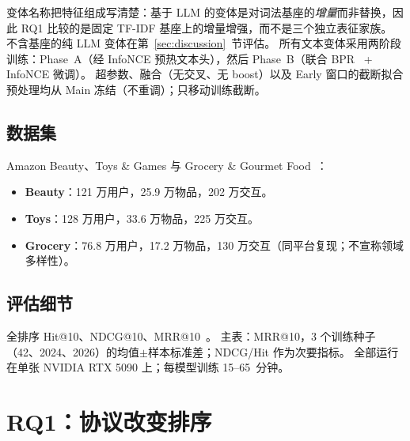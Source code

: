 \documentclass[sigconf,natbib=true,anonymous]{acmart}
\newcommand{\tfidf}{\textsc{TF-IDF}\xspace}
\begin{document}
变体名称把特征组成写清楚：基于 LLM 的变体是对词法基座的\emph{增量}而非替换，因此 RQ1 比较的是固定 \tfidf 基座上的增量增强，而不是三个独立表征家族。
不含基座的纯 LLM 变体在第~\ref{sec:discussion}~节评估。
所有文本变体采用两阶段训练：Phase~A（经 InfoNCE 预热文本头），然后 Phase~B（联合 BPR~\cite{rendle2009bpr} + InfoNCE 微调）。
超参数、融合（无交叉、无 boost）以及 Early 窗口的截断拟合预处理均从 Main 冻结（不重调）；只移动训练截断。

\subsection{数据集}

Amazon Beauty、Toys \& Games 与 Grocery \& Gourmet Food~\cite{mcauley2015amazon,ni2019amazon}：
\begin{itemize}[leftmargin=*,itemsep=1pt]
\item \textbf{Beauty}：121 万用户，25.9 万物品，202 万交互。
\item \textbf{Toys}：128 万用户，33.6 万物品，225 万交互。
\item \textbf{Grocery}：76.8 万用户，17.2 万物品，130 万交互（同平台复现；不宣称领域多样性）。
\end{itemize}

\subsection{评估细节}

全排序 Hit@10、NDCG@10、MRR@10~\cite{krichene2020sampledmetrics}。
主表：MRR@10，3 个训练种子（42、2024、2026）的均值$\pm$样本标准差；NDCG/Hit 作为次要指标。
全部运行在单张 NVIDIA RTX 5090 上；每模型训练 15--65~分钟。

\section{RQ1：协议改变排序}
\label{sec:rq1}
\end{document}
